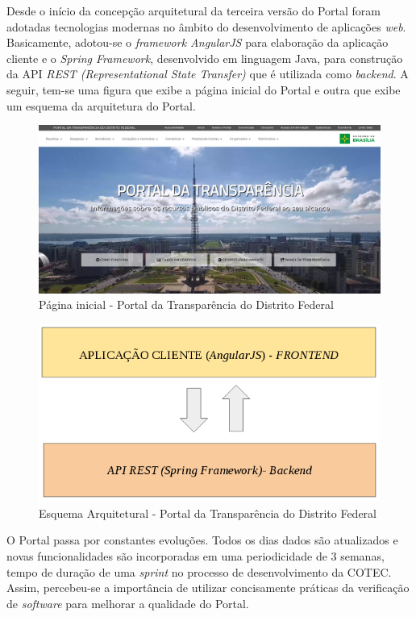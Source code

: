Desde o início da concepção arquitetural da terceira versão do Portal foram adotadas tecnologias modernas no âmbito do desenvolvimento de aplicações \textit{web}. Basicamente, adotou-se o \textit{framework AngularJS} para elaboração da aplicação cliente e o \textit{Spring Framework}, desenvolvido em linguagem Java, para construção da API \textit{REST (Representational State Transfer)} que é utilizada como \textit{backend}. A seguir, tem-se uma figura que exibe a página inicial do Portal e outra que exibe um esquema da arquitetura do Portal.

\begin{figure}[h]
\includegraphics[width=\textwidth]{figuras/portalTransparencia.png}
\caption{Página inicial - Portal da Transparência do Distrito Federal}
\end{figure}

\begin{figure}[h]
\includegraphics[width=\textwidth]{figuras/arquiteturaPortal.png}
\caption{Esquema Arquitetural - Portal da Transparência do Distrito Federal}
\end{figure}

O Portal passa por constantes evoluções. Todos os dias dados são atualizados e novas funcionalidades são incorporadas em uma periodicidade de 3 semanas, tempo de duração de uma \textit{sprint} no processo de desenvolvimento da COTEC. Assim, percebeu-se a importância de utilizar concisamente práticas da verificação de \textit{software} para melhorar a qualidade do Portal.


